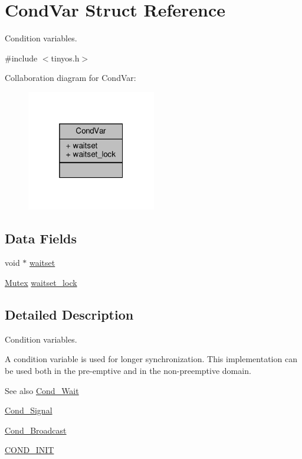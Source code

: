 \hypertarget{structCondVar}{}\section{Cond\+Var Struct Reference}
\label{structCondVar}


Condition variables.  




{\ttfamily \#include $<$tinyos.\+h$>$}



Collaboration diagram for Cond\+Var\+:\nopagebreak
\begin{figure}[H]
\begin{center}
\leavevmode
\includegraphics[width=160pt]{structCondVar__coll__graph}
\end{center}
\end{figure}
\subsection*{Data Fields}
\begin{DoxyCompactItemize}
\item 
void $\ast$ \hyperlink{structCondVar_a7da9e0169713c3b3ae386a8ab49f7e34}{waitset}
\item 
\hyperlink{group__syscalls_gaef2ec62cae8e0031fd19fc8b91083ade}{Mutex} \hyperlink{structCondVar_a477b855f4d3880d231206ae79bd5b6cf}{waitset\+\_\+lock}
\end{DoxyCompactItemize}


\subsection{Detailed Description}
Condition variables. 

A condition variable is used for longer synchronization. This implementation can be used both in the pre-\/emptive and in the non-\/preemptive domain.

\begin{DoxySeeAlso}{See also}
\hyperlink{group__syscalls_ga970dca2210b3f2ec8aedab7f542a9bf4}{Cond\+\_\+\+Wait} 

\hyperlink{group__syscalls_ga43f64f8be273d2fe77d7de5f4b81e22d}{Cond\+\_\+\+Signal} 

\hyperlink{group__syscalls_ga8196aa2a48cad90742f254cc3b8fd351}{Cond\+\_\+\+Broadcast} 

\hyperlink{group__syscalls_ga6a7055a466bff255172e05f6ec82d792}{C\+O\+N\+D\+\_\+\+I\+N\+IT} 
\end{DoxySeeAlso}


